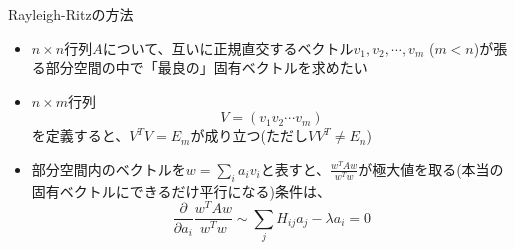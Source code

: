 \begin{frame}[t,fragile]{Rayleigh-Ritzの方法}
  \begin{itemize}
    \setlength{\itemsep}{1em}
  \item $n \times n$行列$A$について、互いに正規直交するベクトル$v_1,v_2,\cdots,v_m$ ($m < n$)が張る部分空間の中で「最良の」固有ベクトルを求めたい
  \item $n \times m$行列
    \[
    V=(v_1 v_2 \cdots v_m)
    \]
    を定義すると、$V^TV=E_m$が成り立つ(ただし$VV^T \ne E_n$)
  \item 部分空間内のベクトルを$w = \sum_i a_i v_i$と表すと、$\frac{w^TAw}{w^Tw}$が極大値を取る(本当の固有ベクトルにできるだけ平行になる)条件は、
    \[
    \frac{\partial}{\partial a_i} \frac{w^TAw}{w^Tw} \sim \sum_j H_{ij}a_j - \lambda a_i = 0
    \]
  \end{itemize}
\end{frame}
